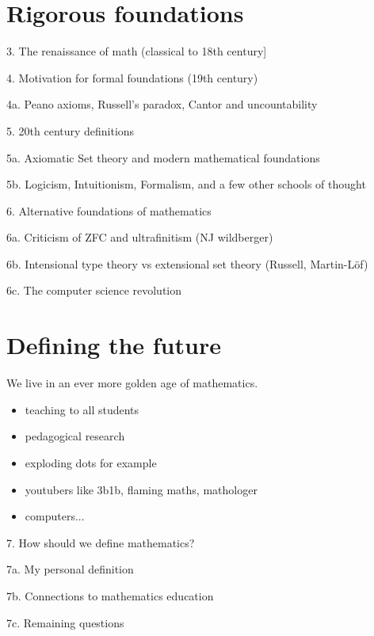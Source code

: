 \documentclass[12pt]{article}
\begin{document}
\section{Rigorous foundations}

3. The renaissance of math (classical to 18th century]

4. Motivation for formal foundations (19th century)

4a. Peano axioms, Russell's paradox, Cantor and uncountability

5. 20th century definitions

5a. Axiomatic Set theory and modern mathematical foundations

5b. Logicism, Intuitionism, Formalism, and a few other schools of thought

6. Alternative foundations of mathematics

6a. Criticism of ZFC and ultrafinitism (NJ wildberger)

6b. Intensional type theory vs extensional set theory (Russell, Martin-Löf)

6c. The computer science revolution

\section{Defining the future}

We live in an ever more golden age of mathematics.

\begin{itemize}
	\item teaching to all students
	\item pedagogical research
	\item exploding dots for example
	\item youtubers like 3b1b, flaming maths, mathologer
	\item computers...
\end{itemize}

7. How should we define mathematics?

7a. My personal definition

7b. Connections to mathematics education

7c. Remaining questions



\end{document}
